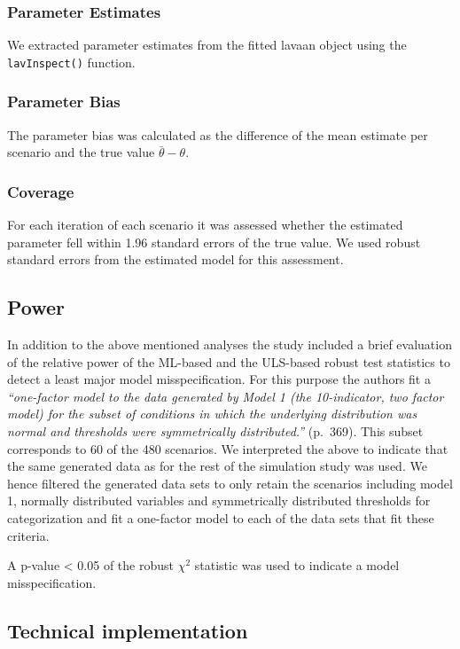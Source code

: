 \documentclass[10,a4paperpaper,]{article}
\begin{document}
\subsubsection{Parameter Estimates}

We extracted parameter estimates from the fitted lavaan object using the
\texttt{lavInspect()} function.

\subsubsection{Parameter Bias}

The parameter bias was calculated as the difference of the mean estimate
per scenario and the true value \(\bar{\theta}-\theta\).

\subsubsection{Coverage}

For each iteration of each scenario it was assessed whether the
estimated parameter fell within 1.96 standard errors of the true value.
We used robust standard errors from the estimated model for this
assessment.

\subsection{Power}

In addition to the above mentioned analyses the study included a brief
evaluation of the relative power of the ML-based and the ULS-based
robust test statistics to detect a least major model misspecification.
For this purpose the authors fit a \emph{``one-factor model to the data
generated by Model 1 (the 10-indicator, two factor model) for the subset
of conditions in which the underlying distribution was normal and
thresholds were symmetrically distributed.''} (p.~369). This subset
corresponds to 60 of the 480 scenarios. We interpreted the above to
indicate that the same generated data as for the rest of the simulation
study was used. We hence filtered the generated data sets to only retain
the scenarios including model 1, normally distributed variables and
symmetrically distributed thresholds for categorization and fit a
one-factor model to each of the data sets that fit these criteria.

A p-value \textless{} 0.05 of the robust \(\chi^2\) statistic was used
to indicate a model misspecification.

\subsection{Technical implementation}
\end{document}
